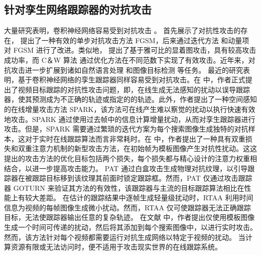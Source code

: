 \subsection{针对孪生网络跟踪器的对抗攻击}
大量研究表明，卷积神经网络容易受到对抗攻击 \cite{Deepsec}。\cite{intriguing} 首先展示了对抗性攻击的存在，\cite{FGSM} 提出了一种有效的单步对抗攻击方法 FGSM，后来通过迭代方法 \cite{kurakin2017adversarial} 和动量项 \cite{dong2018boosting} 对 FGSM 进行了改进。类似地，\cite{papernot2016limitations} 提出了基于雅可比的显着图攻击，具有较高攻击成功率，而 C＆W 算法 \cite{carlini2017towards} 通过优化方法在不同范数下实现了有效攻击。近年来，对抗攻击进一步扩展到诸如自然语言处理 \cite{generating} 和图像目标检测 \cite{wei2019transferable} 等任务。
最近的研究表明，基于卷积神经网络的孪生跟踪器同样容易受到对抗攻击。在 \cite{SPARK} 中，作者正式提出了视频目标跟踪的对抗性攻击问题，即，在线生成无法感知的扰动以误导跟踪器，使其预测成为不正确的轨迹或指定的的轨迹。此外，作者提出了一种空间感知的在线增量攻击方法 SPARK，该方法可在线产生难以察觉的扰动以执行快速有效地攻击。SPARK \cite{SPARK} 通过使用过去帧中的信息计算增量扰动，从而对孪生跟踪器进行攻击。但是，SPARK 需要通过繁琐的迭代方案为每个搜索图像生成独特的对抗样本，这对于实时在线跟踪算法而言非常耗时。在 \cite{chen2020one} 中，作者提出了一种具有双重损失和双重注意力机制的新型攻击方法，在初始帧为模板图像产生对抗性扰动。这这提出的攻击方法的优化目标包括两个损失，每个损失都与精心设计的注意力权重相结合，以进一步提高攻击能力。
PAT \cite{PAT} 通过白盒攻击生成物理对抗纹理，以引导跟踪器在被跟踪目标移到该纹理其前面时锁定跟踪框。然而，PAT 仅通过攻击跟踪器 GOTURN \cite{GOTURN} 来验证其方法的有效性，该跟踪器与主流的目标跟踪算法相比在性能上有较大差距。
在估计的跟踪结果中逐帧生成轻量级扰动时，RTAA \cite{RTAA} 利用时间信息为视频的每帧图像生成微小扰动。然而，RTAA 仅可使跟踪器无法正确跟踪目标，无法使跟踪器输出任意的复杂轨迹。
在文献 \cite{TTP} 中，作者提出仅使用模板图像生成一个时间可传递的扰动，然后将其添加到每个搜索图像中，以进行实时攻击。然而，该方法针对每个视频都需要运行对抗生成网络以特定于视频的扰动。%
当计算资源有限或无法访问时，便不适用于攻击现实世界的在线跟踪系统。
